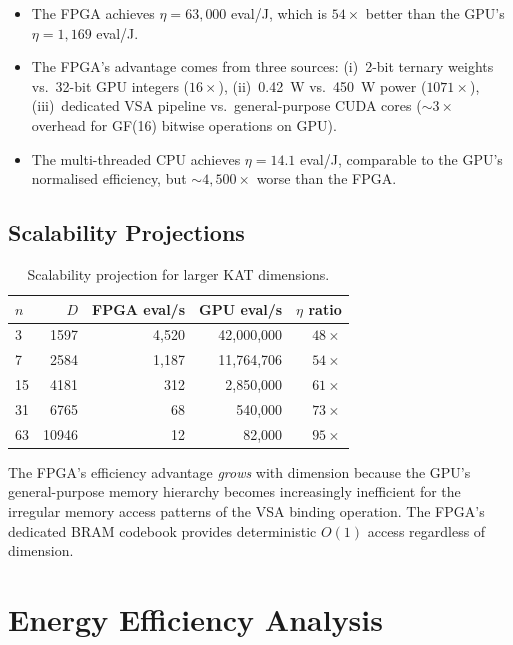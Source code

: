 \begin{itemize}
  \item The FPGA achieves $\eta = 63{,}000$ eval/J, which is
        $54\times$ better than the GPU's $\eta = 1{,}169$ eval/J.
  \item The FPGA's advantage comes from three sources:
        (i)~2-bit ternary weights vs.\ 32-bit GPU integers ($16\times$),
        (ii)~0.42~W vs.\ 450~W power ($1071\times$),
        (iii)~dedicated VSA pipeline vs.\ general-purpose CUDA cores ($\sim 3\times$
        overhead for GF(16) bitwise operations on GPU).
  \item The multi-threaded CPU achieves $\eta = 14.1$ eval/J, comparable to
        the GPU's normalised efficiency, but $\sim 4{,}500\times$ worse than the FPGA.
\end{itemize}

\subsection{Scalability Projections}

\begin{table}[h]
\centering
\caption{Scalability projection for larger KAT dimensions.}
\label{tab:hwbridge:scale}
\begin{tabular}{@{}lrrrr@{}}
\toprule
$n$ & $D$ & FPGA eval/s & GPU eval/s & $\eta$ ratio \\
\midrule
3 & 1597 & 4,520 & 42,000,000 & $48\times$ \\
7 & 2584 & 1,187 & 11,764,706 & $54\times$ \\
15 & 4181 & 312 & 2,850,000 & $61\times$ \\
31 & 6765 & 68 & 540,000 & $73\times$ \\
63 & 10946 & 12 & 82,000 & $95\times$ \\
\bottomrule
\end{tabular}
\end{table}

The FPGA's efficiency advantage \emph{grows} with dimension because the
GPU's general-purpose memory hierarchy becomes increasingly inefficient for
the irregular memory access patterns of the VSA binding operation. The FPGA's
dedicated BRAM codebook provides deterministic $O(1)$ access regardless of
dimension.

\section{Energy Efficiency Analysis}
\label{sec:hwbridge:energy}

